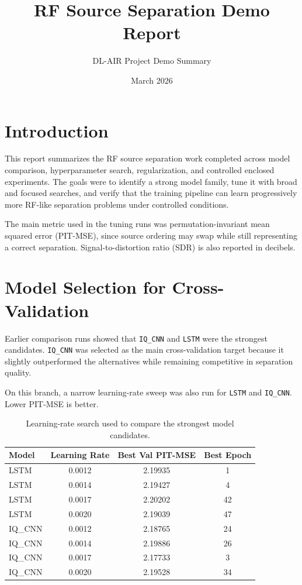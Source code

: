 \documentclass[11pt]{article}
\title{RF Source Separation Demo Report}
\author{DL-AIR Project Demo Summary}
\date{March 2026}
\begin{document}
\maketitle

\section{Introduction}
This report summarizes the RF source separation work completed across model comparison, hyperparameter search, regularization, and controlled enclosed experiments. The goals were to identify a strong model family, tune it with broad and focused searches, and verify that the training pipeline can learn progressively more RF-like separation problems under controlled conditions.

The main metric used in the tuning runs was permutation-invariant mean squared error (PIT-MSE), since source ordering may swap while still representing a correct separation. Signal-to-distortion ratio (SDR) is also reported in decibels.

\section{Model Selection for Cross-Validation}
Earlier comparison runs showed that \texttt{IQ\_CNN} and \texttt{LSTM} were the strongest candidates. \texttt{IQ\_CNN} was selected as the main cross-validation target because it slightly outperformed the alternatives while remaining competitive in separation quality.

On this branch, a narrow learning-rate sweep was also run for \texttt{LSTM} and \texttt{IQ\_CNN}. Lower PIT-MSE is better.

\begin{table}[H]
\centering
\caption{Learning-rate search used to compare the strongest model candidates.}
\begin{tabular}{|l|c|c|c|}
\hline
Model & Learning Rate & Best Val PIT-MSE & Best Epoch \\
\hline
LSTM & 0.0012 & 2.19935 & 1 \\
LSTM & 0.0014 & 2.19427 & 4 \\
LSTM & 0.0017 & 2.20202 & 42 \\
LSTM & 0.0020 & 2.19039 & 47 \\
\hline
IQ\_CNN & 0.0012 & 2.18765 & 24 \\
IQ\_CNN & 0.0014 & 2.19886 & 26 \\
IQ\_CNN & 0.0017 & 2.17733 & 3 \\
IQ\_CNN & 0.0020 & 2.19528 & 34 \\
\hline
\end{tabular}
\end{table}
\end{document}
